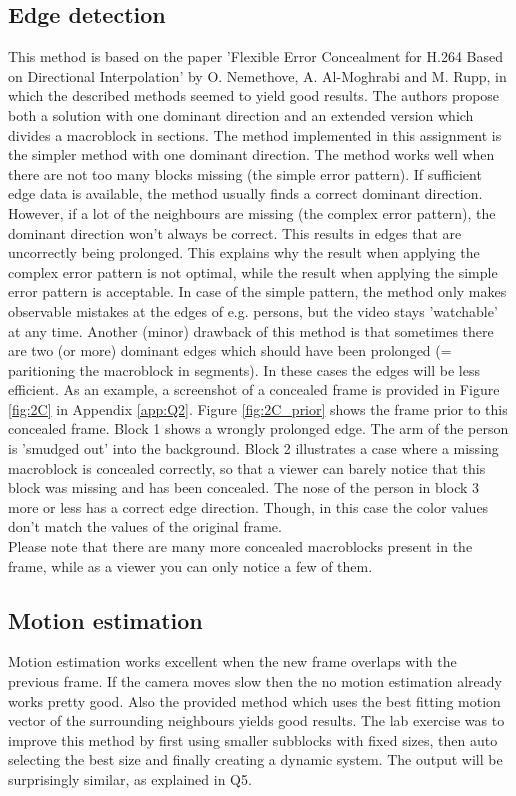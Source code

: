 \subsection{Edge detection}
This method is based on the paper 'Flexible Error Concealment for H.264 Based on Directional Interpolation' by O. Nemethove, A. Al-Moghrabi and M. Rupp, in which the described methods seemed to yield good results. The authors propose both a solution with one dominant direction and an extended version which divides a macroblock in sections. The method implemented in this assignment is the simpler method with one dominant direction.
\npar
The method works well when there are not too many blocks missing (the simple error pattern). If sufficient edge data is available, the method usually finds a correct dominant direction. However, if a lot of the neighbours are missing (the complex error pattern), the dominant direction won't always be correct. This results in edges that are uncorrectly being prolonged. This explains why the result when applying the complex error pattern is not optimal, while the result when applying the simple error pattern is acceptable. In case of the simple pattern, the method only makes observable mistakes at the edges of e.g. persons, but the video stays 'watchable' at any time.
\npar
Another (minor) drawback of this method is that sometimes there are two (or more) dominant edges which should have been prolonged (= paritioning the macroblock in segments). In these cases the edges will be less efficient. 
\npar
As an example, a screenshot of a concealed frame is provided in Figure \ref{fig:2C} in Appendix \ref{app:Q2}. Figure \ref{fig:2C_prior} shows the frame prior to this concealed frame. Block 1 shows a wrongly prolonged edge. The arm of the person is 'smudged out' into the background. Block 2 illustrates a case where a missing macroblock is concealed correctly, so that a viewer can barely notice that this block was missing and has been concealed. The nose of the person in block 3 more or less has a correct edge direction. Though, in this case the color values don't match the values of the original frame.\\
Please note that there are many more concealed macroblocks present in the frame, while as a viewer you can only notice a few of them.
\clearpage
\subsection{Motion estimation}
Motion estimation works excellent when the new frame overlaps with the previous frame. If the camera moves slow then the no motion estimation already works pretty good. Also the provided method which uses the best fitting motion vector of the surrounding neighbours yields good results. The lab exercise was to improve this method by first using smaller subblocks with fixed sizes, then auto selecting the best size and finally creating a dynamic system. The output will be surprisingly similar, as explained in Q5.